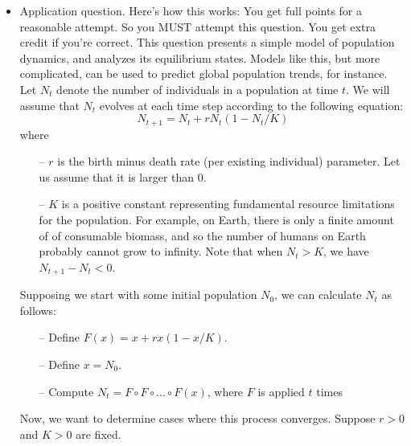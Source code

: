 \documentclass{article}
\begin{document}
\begin{itemize}
    \newpage
    \item Application question. Here’s how this works: You get full points for a reasonable attempt. So you MUST attempt this question. You get extra credit if you’re correct. This question presents a simple model of population dynamics, and analyzes its equilibrium states. Models like this, but more complicated, can be used to predict global population trends, for instance. \newline 
    Let $N_t$ denote the number of individuals in a population at time $t$. We will assume that $N_t$ evolves at each time step according to the following equation:
    \[N_{t+1} = N_t + rN_t(1 - N_t/K)\]
    where
    \begin{itemize}
        \item[--] $r$ is the birth minus death rate (per existing individual) parameter. Let us assume that it is larger than 0.
        \item[--] $K$ is a positive constant representing fundamental resource limitations for the population. For example, on Earth, there is only a finite amount of of consumable biomass, and so the number of humans on Earth probably cannot grow to infinity. Note that when $N_t > K$, we have $N_{t+1} − N_t < 0$.
    \end{itemize}
    Supposing we start with some initial population $N_0$, we can calculate $N_t$ as follows:
    \begin{itemize}
        \item[--] Define $F(x) = x + rx(1 - x/K)$.
        \item[--] Define $x = N_0$.
        \item[--] Compute $N_t = F \circ F \circ ... \circ F(x)$, where $F$ is applied $t$ times
    \end{itemize}
    Now, we want to determine cases where this process converges. Suppose $r > 0$ and $K > 0$ are fixed.
    \begin{itemize}
    

\end{itemize}
\end{itemize}
\end{document}
